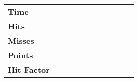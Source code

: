 \documentclass[../Cover.tex]{subfiles}
\begin{document}
\begin{minipage}[t][0.85\textheight][t]{\textwidth}
\begin{tabular}{|l|l|l|l|l|l|l|l|l|l|l|l|l|l|l|l|l|l|l|l|}
		\multicolumn{3}{|l|}{\textbf{Time}}                               &                                    &                                    &                                    &                                    &                                    &                                    &                                    &                                           &         & \multicolumn{8}{l|}{}                                                                                                                                                                            \\ \cline{1-11}
		\multicolumn{3}{|l|}{\textbf{Hits}}                               &                                    &                                    &                                    &                                    &                                    &                                    &                                    &                                           &         & \multicolumn{8}{l|}{}                                                                                                                                                                            \\ \cline{1-11}
		\multicolumn{3}{|l|}{\textbf{Misses}}                             &                                    &                                    &                                    &                                    &                                    &                                    &                                    &                                           &         & \multicolumn{8}{l|}{}                                                                                                                                                                            \\ \cline{1-11}
		\multicolumn{3}{|l|}{\textbf{Points}}                             &                                    &                                    &                                    &                                    &                                    &                                    &                                    &                                           &         & \multicolumn{8}{l|}{}                                                                                                                                                                            \\ \cline{1-11}
		\multicolumn{3}{|l|}{\textbf{Hit Factor}}                         &                                    &                                    &                                    &                                    &                                    &                                    &                                    &                                           &         & \multicolumn{8}{l|}{\multirow{-5}{*}{}}                                                                                                                                                          \\ \cline{1-11} \cline{13-20} 
	\end{tabular}
	

\end{minipage}
\end{document}
